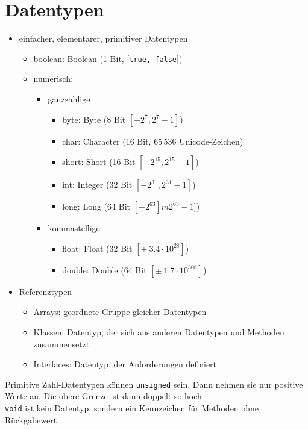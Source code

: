 \section{Datentypen}
\begin{itemize}\itemsep0em
	\item einfacher, elementarer, primitiver Datentypen
	\begin{itemize}
		\item boolean: Boolean (1 Bit, [\texttt{true, false}])
		\item numerisch:
		\begin{itemize}
			\item ganzzahlige
			\begin{itemize}
				\item byte: Byte (8 Bit $[-2^7, 2^7-1]$)
				\item char: Character (16 Bit, $65\,536$ Unicode-Zeichen)
				\item short: Short (16 Bit $[-2^{15}, 2^{15}-1]$)
				\item int: Integer (32 Bit $[-2^{31}, 2^{31}-1]$)
				\item long: Long (64 Bit $[-2^{63}]m 2^{63}-1]$)
			\end{itemize}
			\item kommastellige
			\begin{itemize}
				\item float: Float (32 Bit $[\pm\ 3.4 \cdot 10^{28}]$)
				\item double: Double (64 Bit $[\pm\ 1.7 \cdot 10^{308}]$)
			\end{itemize}
		\end{itemize}
	\end{itemize}
	\item Referenztypen
	\begin{itemize}
		\item Arrays: geordnete Gruppe gleicher Datentypen
		\item Klassen: Datentyp, der sich aus anderen Datentypen und Methoden zusammensetzt
		\item Interfaces: Datentyp, der Anforderungen definiert
	\end{itemize}
\end{itemize}
Primitive Zahl-Datentypen können \texttt{unsigned} sein. Dann nehmen sie nur positive Werte an. Die obere Grenze ist dann doppelt so hoch.\\
\texttt{void} ist kein Datentyp, sondern ein Kennzeichen für Methoden ohne Rückgabewert.

